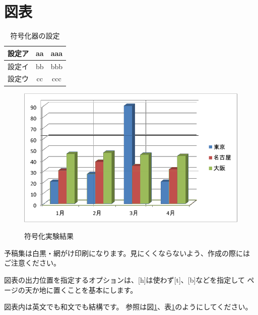 \documentclass[a4paper,10pt,dvipdfmx,twocolumn]{jsarticle}
\begin{document}
\section{図表}

\begin{table}[tb]
   \caption{符号化器の設定}
   \label{tab:settings}
   \centering
   \begin{tabular}{c||c|c}\hline
設定ア & aa & aaa\\\hline
設定イ & bb & bbb\\\hline
設定ウ & cc & ccc\\\hline
   \end{tabular}
\end{table}

\begin{figure}[tb]
   \centering
   \includegraphics[width=.9\hsize]{figure/sample-j.pdf}\\
   \caption{符号化実験結果}
   \label{fig:results}
\end{figure}

予稿集は白黒・網がけ印刷になります。見にくくならないよう、作成の際には
ご注意ください。

図表の出力位置を指定するオプションは、[h]は使わず[t]、[b]などを指定して
ページの天か地に置くことを基本にします。

図表内は英文でも和文でも結構です。
参照は図\ref{fig:results}、表\ref{tab:settings}のようにしてください。



\end{document}
